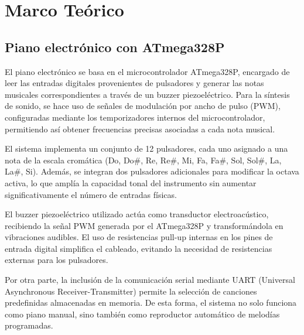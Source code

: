 \section{Marco Teórico}

\subsection{Piano electrónico con ATmega328P}
El piano electrónico se basa en el microcontrolador ATmega328P, encargado de leer las entradas digitales provenientes de pulsadores y generar las notas musicales correspondientes a través de un buzzer piezoeléctrico. Para la síntesis de sonido, se hace uso de señales de modulación por ancho de pulso (PWM), configuradas mediante los temporizadores internos del microcontrolador, permitiendo así obtener frecuencias precisas asociadas a cada nota musical.

El sistema implementa un conjunto de 12 pulsadores, cada uno asignado a una nota de la escala cromática (Do, Do\#, Re, Re\#, Mi, Fa, Fa\#, Sol, Sol\#, La, La\#, Si). Además, se integran dos pulsadores adicionales para modificar la octava activa, lo que amplía la capacidad tonal del instrumento sin aumentar significativamente el número de entradas físicas.

El buzzer piezoeléctrico utilizado actúa como transductor electroacústico, recibiendo la señal PWM generada por el ATmega328P y transformándola en vibraciones audibles. El uso de resistencias pull-up internas en los pines de entrada digital simplifica el cableado, evitando la necesidad de resistencias externas para los pulsadores.

Por otra parte, la inclusión de la comunicación serial mediante UART (Universal Asynchronous Receiver-Transmitter) permite la selección de canciones predefinidas almacenadas en memoria. De esta forma, el sistema no solo funciona como piano manual, sino también como reproductor automático de melodías programadas.
